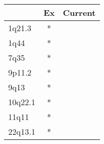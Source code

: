 \begin{tabular}{lcc}
\toprule
{} & Ex & Current \\
\midrule
1q21.3  &  * &         \\
1q44    &  * &         \\
7q35    &  * &         \\
9p11.2  &  * &         \\
9q13    &  * &         \\
10q22.1 &  * &         \\
11q11   &  * &         \\
22q13.1 &  * &         \\
\bottomrule
\end{tabular}
